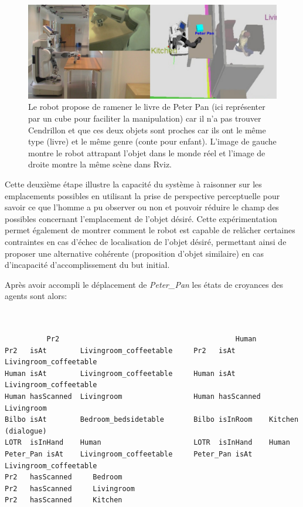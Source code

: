 \documentclass[a4paper,11pt,twoside]{StyleThese}
\begin{document}
\begin{figure}[ht!]
 \centering
  \includegraphics[width=0.99\linewidth]{./img/mardiDemo4.jpg} 
  \caption {Le robot propose de ramener le livre de Peter Pan (ici représenter par un cube pour faciliter la manipulation) car il n'a pas trouver Cendrillon et que ces deux objets sont proches car ils ont le même type (livre) et le même genre (conte pour enfant). L'image de gauche montre le robot attrapant l'objet dans le monde réel et l'image de droite montre la même scène dans Rviz.}
  \label{fig:mardiDemo4}
\end{figure}

Cette deuxième étape illustre la capacité du système à raisonner sur les emplacements possibles en utilisant la prise de perspective perceptuelle pour savoir ce que l'homme a pu observer ou non et pouvoir réduire le champ des possibles concernant l'emplacement de l'objet désiré. Cette expérimentation permet également de montrer comment le robot est capable de relâcher certaines contraintes en cas d'échec de localisation de l'objet désiré, permettant ainsi de proposer une alternative cohérente (proposition d'objet similaire) en cas d'incapacité d'accomplissement du but initial.


Après avoir accompli le déplacement de \textit{Peter\_Pan} les états de croyances des agents sont alors:

\begin{scriptsize}
\begin{verbatim}


          Pr2                                          Human
Pr2   isAt        Livingroom_coffeetable     Pr2   isAt        Livingroom_coffeetable
Human isAt        Livingroom_coffeetable     Human isAt        Livingroom_coffeetable
Human hasScanned  Livingroom                 Human hasScanned  Livingroom
Bilbo isAt        Bedroom_bedsidetable       Bilbo isInRoom    Kitchen (dialogue)
LOTR  isInHand    Human                      LOTR  isInHand    Human 
Peter_Pan isAt    Livingroom_coffeetable     Peter_Pan isAt    Livingroom_coffeetable 
Pr2   hasScanned     Bedroom
Pr2   hasScanned     Livingroom
Pr2   hasScanned     Kitchen

\end{verbatim}
\end{scriptsize}
\end{document}

